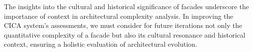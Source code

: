 


The insights into the cultural and historical significance of facades underscore the importance of context in architectural complexity analysis.
In improving the CICA system's assessments, we must consider for future iterations not only the quantitative complexity of a facade but also its cultural resonance and historical context, ensuring a holistic evaluation of architectural evolution.